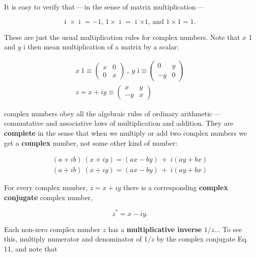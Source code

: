 It is easy to verify that\,---\,in the sense of matrix multiplication\,---

\begin{equation}
  \text{i $\times$ i $= -1$, $1 \times$ i $=$ i $\times 1$, and $1 \times 1 = 1$.}
\end{equation}

These are just the usual multiplication rules for complex numbers. Note that $x$ 1 and $y$ i then mean multiplication of a matrix by a scalar:

\begin{equation*}
  \begin{aligned}
    x\ 1 \equiv
    \begin{pmatrix}
      x & 0 \\ 0 & x
    \end{pmatrix}
    \ ,\ y \text{ i} \equiv
    \begin{pmatrix}
      0 & y \\ -y & 0
    \end{pmatrix}\\
    z = x + iy \equiv
    \begin{pmatrix}
      x & y \\ -y & x
    \end{pmatrix}
  \end{aligned}
\end{equation*}

 complex numbers obey all the algebraic rules of ordinary arithmetic\,---\,commutative and associative laws of multiplication and addition. They are \textbf{complete} in the sense that when we multiply or add two complex numbers we get a \textbf{complex} number, not some other kind of number:

\begin{equation}
  \begin{aligned}
    (a + ib)\ (x + iy) = (ax - by)\ +\ i(ay + bx) \\
    (a + ib)\ (x + iy) = (ax - by)\ +\ i(ay + bx)
  \end{aligned}
\end{equation}

For every complex number, $z = x + iy$ there is a corresponding \textbf{complex conjugate} complex number,

\begin{equation}
  z^* = x - iy.
\end{equation}

Each non-zero complex number $z$ has a \textbf{multiplicative inverse} $1/z\ldots$ To see this, multiply numerator and denominator of $1/z$ by the complex conjugate Eq. 11, and note that

